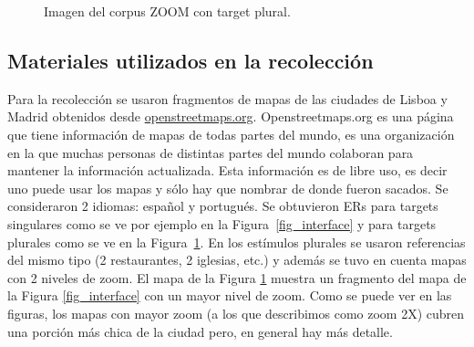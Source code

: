 \begin{figure}[h]
\begin{center}
\caption{Imagen del corpus ZOOM con target plural.}
\label{mapa20-5}
\end{center}
\end{figure}




\subsection{Materiales utilizados en la recolecci\'on}
\label{corpus-materiales}

Para la recolecci\'on se usaron fragmentos de mapas de las ciudades de Lisboa y Madrid obtenidos desde \url{openstreetmaps.org}. Openstreetmaps.org es una p\'agina que tiene informaci\'on de mapas de todas partes del mundo, es una organizaci\'on en la que muchas personas de distintas partes del mundo colaboran para mantener la informaci\'on actualizada. Esta informaci\'on es de libre uso, es decir uno puede usar los mapas y s\'olo hay que nombrar de donde fueron sacados.
Se consideraron 2 idiomas: espa\~nol y portugu\'es. Se obtuvieron ERs para targets singulares como se ve por ejemplo en la Figura~\ref{fig_interface} y para targets plurales como se ve en la Figura~\ref{mapa20-5}. En los est\'imulos plurales se usaron referencias del mismo tipo (2 restaurantes, 2 iglesias, etc.) y adem\'as se tuvo en cuenta mapas con 2 niveles de zoom. El mapa de la Figura \ref{mapa20-5} muestra un fragmento del mapa de la Figura \ref{fig_interface} con un mayor nivel de zoom. Como se puede ver en las figuras, los mapas con mayor zoom (a los que describimos como zoom 2X) cubren una porci\'on m\'as chica de la ciudad pero, en general hay m\'as detalle.

